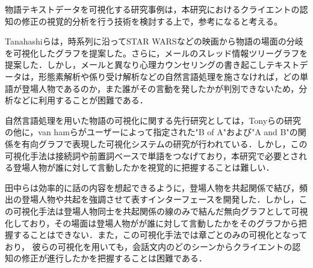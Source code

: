 \documentclass[shuuron]{kuee}
\begin{document}
物語テキストデータを可視化する研究事例は，本研究におけるクライエントの認知の修正の視覚的分析を行う技術を検討する上で，参考になると考える。

Tanahashiら\cite{tanahashi2012design}は，時系列に沿ってSTAR WARSなどの映画から物語の場面の分岐を可視化したグラフを提案した。さらに，メールのスレッド情報ツリーグラフを提案した\cite{tanahashi2015efficient}．しかし，メールと異なり心理カウンセリングの書き起こしテキストデータは，形態素解析や係り受け解析などの自然言語処理を施さなければ，どの単語が登場人物であるのか，また誰がその言動を発したかが判別できないため，分析などに利用することが困難である．

自然言語処理を用いた物語の可視化に関する先行研究としては，Tonyら\cite{bergstrom2007seeing}の研究の他に，van hamら\cite{van2009mapping}がユーザーによって指定された"B of A"および"A and B"の関係を有向グラフで表現した可視化システムの研究が行われている．しかし，この可視化手法は接続詞や前置詞ベースで単語をつなげており，本研究で必要とされる登場人物が誰に対して言動したかを視覚的に把握することは難しい．

田中ら\cite{tanaka}は効率的に話の内容を想起できるように，登場人物を共起関係で結び，頻出の登場人物や共起を強調させて表すインターフェースを開発した．しかし，この可視化手法は登場人物同士を共起関係の線のみで結んだ無向グラフとして可視化しており，その場面は登場人物がが誰に対して言動したかをそのグラフから把握することはできない．また，この可視化手法では章ごとのみの可視化となっており， 彼らの可視化を用いても，会話文内のどのシーンからクライエントの認知の修正が進行したかを把握することは困難である．






\end{document}
